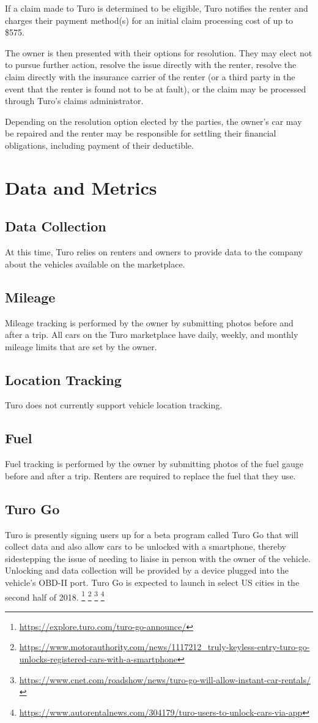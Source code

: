 \documentclass[review,12pt]{elsarticle}
\begin{document}
If a claim made to Turo is determined to be eligible, Turo notifies the renter and charges their payment method(s) for an initial claim processing cost of up to \$575.

The owner is then presented with their options for resolution. They may elect not to pursue further action, resolve the issue directly with the renter, resolve the claim directly with the insurance carrier of the renter (or a third party in the event that the renter is found not to be at fault), or the claim may be processed through Turo's claims administrator.

Depending on the resolution option elected by the parties, the owner's car may be repaired and the renter may be responsible for settling their financial obligations, including payment of their deductible.

\section{Data and Metrics}
  \subsection{Data Collection}
  At this time, Turo relies on renters and owners to provide data to the company about the vehicles available on the marketplace.
  \subsection{Mileage}
  Mileage tracking is performed by the owner by submitting photos before and after a trip. All cars on the Turo marketplace have daily, weekly, and monthly mileage limits that are set by the owner.
  \subsection{Location Tracking}
  Turo does not currently support vehicle location tracking.
  \subsection{Fuel}
  Fuel tracking is performed by the owner by submitting photos of the fuel gauge before and after a trip. Renters are required to replace the fuel that they use.
  \subsection{Turo Go}
  Turo is presently signing users up for a beta program called Turo Go that will collect data and also allow cars to be unlocked with a smartphone, thereby sidestepping the issue of needing to liaise in person with the owner of the vehicle. Unlocking and data collection will be provided by a device plugged into the vehicle's OBD-II port. Turo Go is expected to launch in select US cities in the second half of 2018.
  \footnote{\url{https://explore.turo.com/turo-go-announce/}}
  \footnote{\url{https://www.motorauthority.com/news/1117212_truly-keyless-entry-turo-go-unlocks-registered-cars-with-a-smartphone}
  }
  \footnote{\url{https://www.cnet.com/roadshow/news/turo-go-will-allow-instant-car-rentals/}
  }
  \footnote{\url{https://www.autorentalnews.com/304179/turo-users-to-unlock-cars-via-app}
  }
\end{document}
